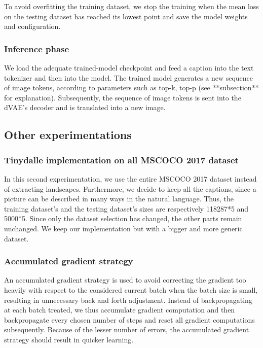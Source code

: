 \documentclass{article}
\begin{document}
To avoid overfitting the training dataset, we stop the training when the mean loss on the testing dataset has reached its lowest point and save the model weights and configuration.

\subsubsection{Inference phase}

We load the adequate trained-model checkpoint and feed a caption into the text tokenizer and then into the model. The trained model generates a new sequence of image tokens, according to parameters such as top-k, top-p (see **subsection** for explanation). Subsequently, the sequence of image tokens is sent into the dVAE's decoder and is translated into a new image.

\subsection{Other experimentations}
\subsubsection{Tinydalle implementation on all MSCOCO 2017 dataset}

In this second experimentation, we use the entire MSCOCO 2017 dataset instead of extracting landscapes. Furthermore, we decide to keep all the captions, since a picture can be described in many ways in the natural language. Thus, the training dataset's and the testing dataset's sizes are respectively 118287*5 and 5000*5.
Since only the dataset selection has changed, the other parts remain unchanged. We keep our implementation but with a bigger and more generic dataset.

\subsubsection{Accumulated gradient strategy}

An accumulated gradient strategy is used to avoid correcting the gradient too heavily with respect to the considered current batch when the batch size is small, resulting in unnecessary back and forth adjustment. Instead of backpropagating at each batch treated, we thus accumulate gradient computation and then backpropagate every chosen number of steps and reset all gradient computations subsequently. Because of the lesser number of errors, the accumulated gradient strategy should result in quicker learning.
\end{document}
